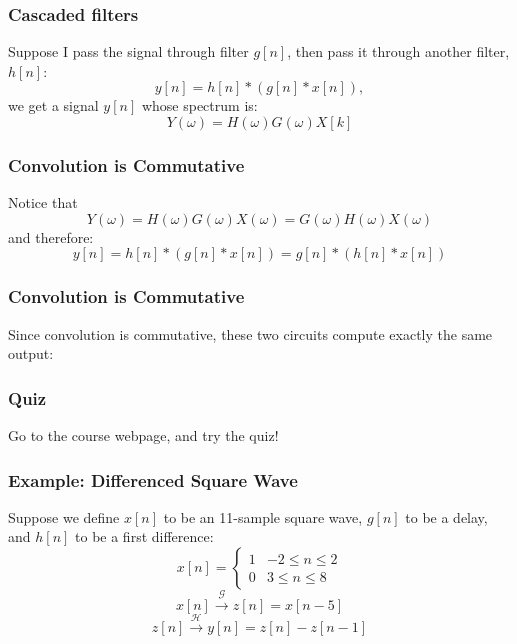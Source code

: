 \documentclass{beamer}
\begin{document}
\begin{frame}
  \frametitle{Cascaded filters}

  Suppose I pass the signal through filter $g[n]$, then pass it through
  another filter, $h[n]$:
  \[
  y[n]=h[n]\ast \left(g[n]\ast x[n]\right),
  \]
  we get a signal $y[n]$ whose spectrum is:
  \[
  Y(\omega)=H(\omega) G(\omega) X[k]
  \]
\end{frame}

\begin{frame}
  \frametitle{Convolution  is Commutative}

  Notice that
  \[
  Y(\omega) = H(\omega) G(\omega) X(\omega)=G(\omega)H(\omega) X(\omega)
  \]
  and therefore:
  \[
  y[n]=h[n]\ast \left(g[n]\ast x[n]\right)=g[n]\ast \left(h[n]\ast x[n]\right)
  \]
\end{frame}

\begin{frame}
  \frametitle{Convolution  is Commutative}

  Since convolution is commutative, these two circuits compute exactly the same output:
  \begin{center}
  \end{center}
  \begin{center}
  \end{center}
\end{frame}

\begin{frame}
  \frametitle{Quiz}

  Go to the course webpage, and try the quiz!
\end{frame}

  
\begin{frame}
  \frametitle{Example: Differenced Square Wave}

  Suppose we define $x[n]$ to be an 11-sample square wave,
  $g[n]$ to be a delay, and $h[n]$ to be a first difference:
  \[
  x[n] = \begin{cases}
    1 & -2\le n\le 2\\
    0 & 3\le n\le 8
  \end{cases}
  \]
  \[
  x[n] \stackrel{\mathcal G}{\longrightarrow} z[n] = x[n-5]
  \]
  \[
  z[n] \stackrel{\mathcal H}{\longrightarrow} y[n] = z[n]-z[n-1]
  \]
\end{frame}
\end{document}

